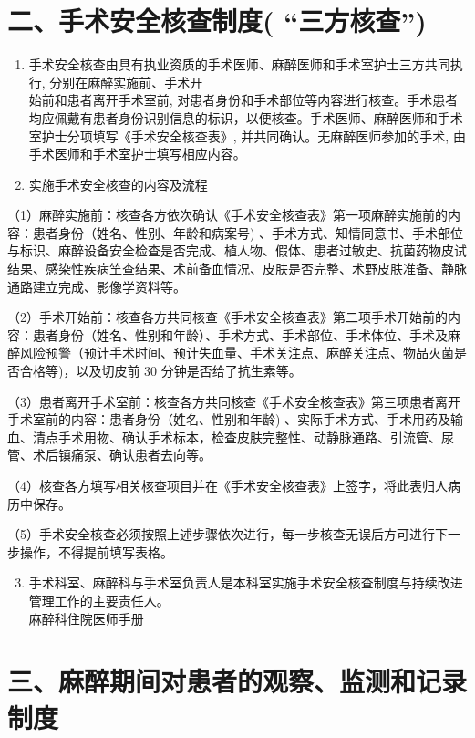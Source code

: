 \documentclass[10pt]{article}
\begin{document}
\section*{二、手术安全核查制度( “三方核查”)}
\begin{enumerate}
  \item 手术安全核查由具有执业资质的手术医师、麻醉医师和手术室护士三方共同执行, 分别在麻醉实施前、手术开\\
始前和患者离开手术室前, 对患者身份和手术部位等内容进行核查。手术患者均应佩戴有患者身份识别信息的标识，以便核查。手术医师、麻醉医师和手术室护士分项填写《手术安全核查表》, 并共同确认。无麻醉医师参加的手术, 由手术医师和手术室护士填写相应内容。

  \item 实施手术安全核查的内容及流程

\end{enumerate}

（1）麻醉实施前：核查各方依次确认《手术安全核查表》第一项麻醉实施前的内容：患者身份（姓名、性别、年龄和病案号) 、手术方式、知情同意书、手术部位与标识、麻醉设备安全检查是否完成、植人物、假体、患者过敏史、抗菌药物皮试结果、感染性疾病笁查结果、术前备血情况、皮肤是否完整、术野皮肤准备、静脉通路建立完成、影像学资料等。

（2）手术开始前：核查各方共同核查《手术安全核查表》第二项手术开始前的内容：患者身份（姓名、性别和年龄）、手术方式、手术部位、手术体位、手术及麻醉风险预警（预计手术时间、预计失血量、手术关注点、麻醉关注点、物品灭菌是否合格等)，以及切皮前 30 分钟是否给了抗生素等。

（3）患者离开手术室前：核查各方共同核查《手术安全核查表》第三项患者离开手术室前的内容：患者身份（姓名、性别和年龄) 、实际手术方式、手术用药及输血、清点手术用物、确认手术标本，检查皮肤完整性、动静脉通路、引流管、尿管、术后镇痛泵、确认患者去向等。

（4）核查各方填写相关核查项目并在《手术安全核查表》上签字，将此表归人病历中保存。

（5）手术安全核查必须按照上述步骤依次进行，每一步核查无误后方可进行下一步操作，不得提前填写表格。

\begin{enumerate}
  \setcounter{enumi}{2}
  \item 手术科室、麻醉科与手术室负责人是本科室实施手术安全核查制度与持续改进管理工作的主要责任人。\\
麻醉科住院医师手册
\end{enumerate}

\section*{三、麻醉期间对患者的观察、监测和记录制度}
\end{document}
